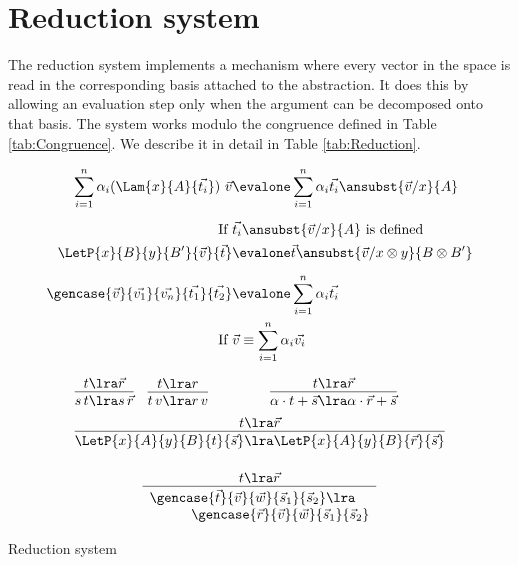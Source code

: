 \section{Reduction system}\label{sec:reduction}

The reduction system implements a mechanism where every vector in the space is read in the corresponding basis attached to the abstraction. It does this by allowing an evaluation step only when the argument can be decomposed onto that basis. The system works modulo the congruence defined in Table \ref{tab:Congruence}. We describe it in detail in Table \ref{tab:Reduction}.

\begin{table*}[tb]
  \small
  \begin{align*}
    \sum_{i=1}^{n}\alpha_i(\Lam{x}{A}{\vec{t_i}})\ \vec{v} &\evalone \sum_{i=1}^{n} \alpha_i \vec{t_i}\ansubst{\vec v/x}{A}\\[5pt]
    \text{If }&\vec{t_i}\ansubst{\vec v/x}{A}\text{ is defined}\\
    \LetP{x}{B}{y}{B'}{\vec v}{\vec{t}} & \evalone\vec{t}\ansubst{\vec{v}/x\otimes y}{B\otimes B'}\\[5pt]
    \gencase{\vec{v}}{\vec{v_1}}{\vec{v_n}}{\vec{t_1}}{\vec{t_2}}
    &\evalone\sum_{i=1}^{n} \alpha_i \vec{t_i}\\
    \text{If }&\vec{v}\equiv\sum_{i=1}^{n}\alpha_i \vec{v_i}
  \end{align*}
  
  \[
  \begin{array}{c c c}
    \infer{s\,t\lra s\,\vec r}{t\lra \vec r}
      &
      \infer{t\,v\lra r\,v}{t\lra r}
      &
      \infer{\alpha\cdot t+\vec s\lra\alpha\cdot\vec r+\vec s}{t\lra\vec r}\\[5pt]
      \multicolumn{3}{c}{
      \infer{\LetP{x}{A}{y}{B}{t}{\vec{s}}\lra \LetP{x}{A}{y}{B}{\vec r}{\vec{s}}}{t\lra \vec r}}
      \\[5pt]
  \end{array}
  \]

  \[
  \begin{array}{c}
      \infer
      {\begin{array}{c c}
        \gencase{\vec t}{\vec v}{\vec w}{\vec s_1}{\vec s_2}\lra&\\
        \multicolumn{2}{r}{\gencase{\vec r}{\vec v}{\vec w}{\vec s_1}{\vec s_2}}
      \end{array}
      }
      {t\lra \vec r}
  \end{array}
  \]
  \caption{Reduction system}
  \label{tab:Reduction}
\end{table*}

